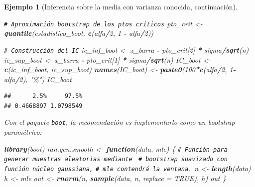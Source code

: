 \documentclass[
]{book}
\newenvironment{Shaded}{\begin{snugshade}}{\end{snugshade}}
\newcommand{\AttributeTok}[1]{\textcolor[rgb]{0.13,0.29,0.53}{#1}}
\newcommand{\CommentTok}[1]{\textcolor[rgb]{0.56,0.35,0.01}{\textit{#1}}}
\newcommand{\ConstantTok}[1]{\textcolor[rgb]{0.56,0.35,0.01}{#1}}
\newcommand{\ControlFlowTok}[1]{\textcolor[rgb]{0.13,0.29,0.53}{\textbf{#1}}}
\newcommand{\DecValTok}[1]{\textcolor[rgb]{0.00,0.00,0.81}{#1}}
\newcommand{\FunctionTok}[1]{\textcolor[rgb]{0.13,0.29,0.53}{\textbf{#1}}}
\newcommand{\NormalTok}[1]{#1}
\newcommand{\OtherTok}[1]{\textcolor[rgb]{0.56,0.35,0.01}{#1}}
\newcommand{\SpecialCharTok}[1]{\textcolor[rgb]{0.81,0.36,0.00}{\textbf{#1}}}
\newcommand{\StringTok}[1]{\textcolor[rgb]{0.31,0.60,0.02}{#1}}
\theoremstyle{break}
\newtheorem{example}{Ejemplo}[chapter]
\theoremstyle{nonumberplain}
\renewcommand{\CommentTok}[1]{\textcolor[rgb]{0.41,0.41,0.41}{\texttt{#1}}}
\begin{document}
\begin{example}[Inferencia sobre la media con varianza conocida, continuación]
\begin{Shaded}
\begin{Highlighting}[]
\CommentTok{\# Aproximación bootstrap de los ptos críticos}
\NormalTok{pto\_crit }\OtherTok{\textless{}{-}} \FunctionTok{quantile}\NormalTok{(estadistico\_boot, }\FunctionTok{c}\NormalTok{(alfa}\SpecialCharTok{/}\DecValTok{2}\NormalTok{, }\DecValTok{1} \SpecialCharTok{{-}}\NormalTok{ alfa}\SpecialCharTok{/}\DecValTok{2}\NormalTok{))}

\CommentTok{\# Construcción del IC}
\NormalTok{ic\_inf\_boot }\OtherTok{\textless{}{-}}\NormalTok{ x\_barra }\SpecialCharTok{{-}}\NormalTok{ pto\_crit[}\DecValTok{2}\NormalTok{] }\SpecialCharTok{*}\NormalTok{ sigma}\SpecialCharTok{/}\FunctionTok{sqrt}\NormalTok{(n)}
\NormalTok{ic\_sup\_boot }\OtherTok{\textless{}{-}}\NormalTok{ x\_barra }\SpecialCharTok{{-}}\NormalTok{ pto\_crit[}\DecValTok{1}\NormalTok{] }\SpecialCharTok{*}\NormalTok{ sigma}\SpecialCharTok{/}\FunctionTok{sqrt}\NormalTok{(n)}
\NormalTok{IC\_boot }\OtherTok{\textless{}{-}} \FunctionTok{c}\NormalTok{(ic\_inf\_boot, ic\_sup\_boot)}
\FunctionTok{names}\NormalTok{(IC\_boot) }\OtherTok{\textless{}{-}} \FunctionTok{paste0}\NormalTok{(}\DecValTok{100}\SpecialCharTok{*}\FunctionTok{c}\NormalTok{(alfa}\SpecialCharTok{/}\DecValTok{2}\NormalTok{, }\DecValTok{1}\SpecialCharTok{{-}}\NormalTok{alfa}\SpecialCharTok{/}\DecValTok{2}\NormalTok{), }\StringTok{"\%"}\NormalTok{)}
\NormalTok{IC\_boot}
\end{Highlighting}
\end{Shaded}

\begin{verbatim}
##      2.5%     97.5% 
## 0.4668897 1.0798549
\end{verbatim}

Con el paquete \texttt{boot}, la recomendación es implementarlo como
un bootstrap paramétrico:

\begin{Shaded}
\begin{Highlighting}[]
\FunctionTok{library}\NormalTok{(boot)}
\NormalTok{ran.gen.smooth }\OtherTok{\textless{}{-}} \ControlFlowTok{function}\NormalTok{(data, mle) \{}
    \CommentTok{\# Función para generar muestras aleatorias mediante }
    \CommentTok{\# bootstrap suavizado con función núcleo gaussiana,}
    \CommentTok{\# mle contendrá la ventana.}
\NormalTok{    n }\OtherTok{\textless{}{-}} \FunctionTok{length}\NormalTok{(data)}
\NormalTok{    h }\OtherTok{\textless{}{-}}\NormalTok{ mle}
\NormalTok{    out }\OtherTok{\textless{}{-}} \FunctionTok{rnorm}\NormalTok{(n, }\FunctionTok{sample}\NormalTok{(data, n, }\AttributeTok{replace =} \ConstantTok{TRUE}\NormalTok{), h)}
\NormalTok{    out}
\NormalTok{\}}


\end{Highlighting}
\end{Shaded}
\end{example}
\end{document}
